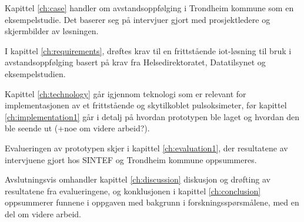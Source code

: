Kapittel \ref{ch:case} handler om avstandsoppfølging i Trondheim kommune som en eksempelstudie. Det baserer seg på intervjuer gjort med
prosjektledere og skjermbilder av løsningen.

I kapittel \ref{ch:requirements}, drøftes krav til en frittstående \gls{iot}-løsning til bruk i avstandsoppfølging basert på krav fra Helsedirektoratet,
Datatilsynet og eksempelstudien.

Kapittel \ref{ch:technology} går igjennom teknologi som er relevant for implementasjonen av et frittstående og skytilkoblet pulsoksimeter,
før kapittel \ref{ch:implementation1} går i detalj på hvordan prototypen ble laget og hvordan den ble seende ut (+noe om videre arbeid?).

Evalueringen av prototypen skjer i kapittel \ref{ch:evaluation1}, der resultatene av intervjuene gjort hos SINTEF og Trondheim kommune oppsummeres.

Avslutningsvis omhandler kapittel \ref{ch:discussion} diskusjon og drøfting av resultatene fra evalueringene, og konklusjonen i kapittel \ref{ch:conclusion}
oppsummerer funnene i oppgaven med bakgrunn i forskningsspørsmålene, med en del om videre arbeid.